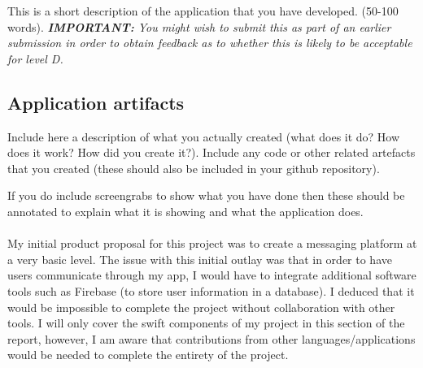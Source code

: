 \documentclass[a4paper, 11pt]{report}
\begin{document}
This is a short description of the application that you have developed. (50-100 words).
\textit{{\bf IMPORTANT:} You might wish to submit this as part of an earlier submission in order to obtain feedback as to whether this is likely to be acceptable for level D.}

\subsection{Application artifacts}

Include here a description of what you actually created (what does it do? How does it work? How did you create it?). Include any code or other related artefacts that you created (these should also be included in your github repository).

If you do include screengrabs to show what you have done then these should be annotated to explain what it is showing and what the application does.\\
\\

My initial product proposal for this project was to create a messaging platform at a very basic level. The issue with this initial outlay was that in order to have users communicate through my app, I would have to integrate additional software tools such as Firebase (to store user information in a database). I deduced that it would be impossible to complete the project without collaboration with other tools. I will only cover the swift components of my project in this section of the report, however, I am aware that contributions from other languages/applications would be needed to complete the entirety of the project.\\
\\
\\
\\
\\
\\
\\
\\
\\
\\
\\
\\
\\
\\
\\
\\
\\
\\
\\
\\
\\
\\
\\
\\
\end{document}

